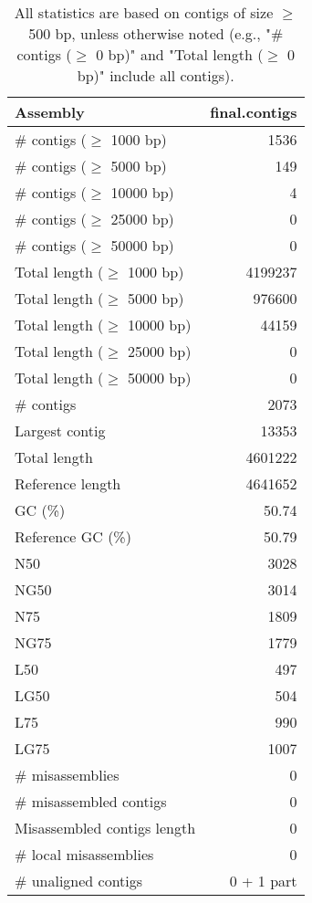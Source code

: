 \documentclass[12pt,a4paper]{article}
\begin{document}
\begin{table}[ht]
\begin{center}
\caption{All statistics are based on contigs of size $\geq$ 500 bp, unless otherwise noted (e.g., "\# contigs ($\geq$ 0 bp)" and "Total length ($\geq$ 0 bp)" include all contigs).}
\begin{tabular}{|l*{1}{|r}|}
\hline
Assembly & final.contigs \\ \hline
\# contigs ($\geq$ 1000 bp) & 1536 \\ \hline
\# contigs ($\geq$ 5000 bp) & 149 \\ \hline
\# contigs ($\geq$ 10000 bp) & 4 \\ \hline
\# contigs ($\geq$ 25000 bp) & 0 \\ \hline
\# contigs ($\geq$ 50000 bp) & 0 \\ \hline
Total length ($\geq$ 1000 bp) & 4199237 \\ \hline
Total length ($\geq$ 5000 bp) & 976600 \\ \hline
Total length ($\geq$ 10000 bp) & 44159 \\ \hline
Total length ($\geq$ 25000 bp) & 0 \\ \hline
Total length ($\geq$ 50000 bp) & 0 \\ \hline
\# contigs & 2073 \\ \hline
Largest contig & 13353 \\ \hline
Total length & 4601222 \\ \hline
Reference length & 4641652 \\ \hline
GC (\%) & 50.74 \\ \hline
Reference GC (\%) & 50.79 \\ \hline
N50 & 3028 \\ \hline
NG50 & 3014 \\ \hline
N75 & 1809 \\ \hline
NG75 & 1779 \\ \hline
L50 & 497 \\ \hline
LG50 & 504 \\ \hline
L75 & 990 \\ \hline
LG75 & 1007 \\ \hline
\# misassemblies & 0 \\ \hline
\# misassembled contigs & 0 \\ \hline
Misassembled contigs length & 0 \\ \hline
\# local misassemblies & 0 \\ \hline
\# unaligned contigs & 0 + 1 part \\ \hline

\end{tabular}
\end{center}
\end{table}
\end{document}
